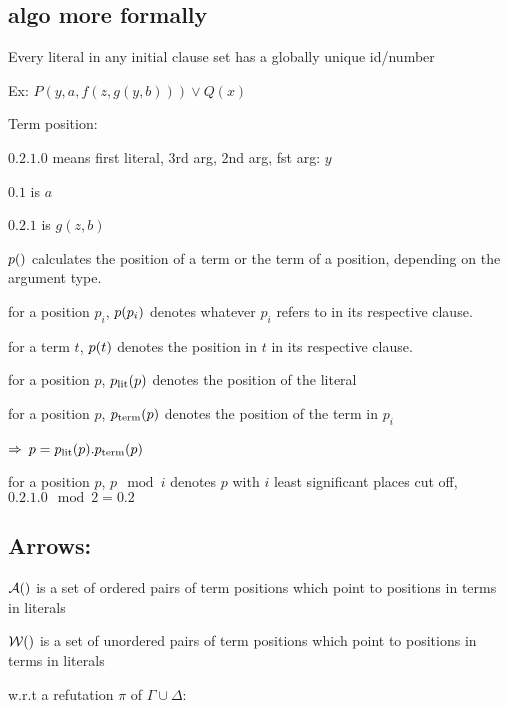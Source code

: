 \documentclass[,%
	paper=a4,%
	DIV14, 
	liststotoc,
	bibtotoc,
	draft=false,%
	numbers=noendperiod
]{scrartcl}
\begin{document}
\clearpage
\subsection{algo more formally}

Every literal in any initial clause set has a globally unique id/number

Ex: $P(y, a, f(z, g(y, b)) ) \lor Q(x)$

Term position:

$0.2.1.0$ means first literal, 3rd arg, 2nd arg, fst arg: $y$

$0.1$ is $a$

$0.2.1$ is $g(z, b)$

$\pos$ calculates the position of a term or the term of a position, depending on the argument type.

for a position $p_i$, $p(p_i)$ denotes whatever $p_i$ refers to in its respective clause.

for a term $t$, $p(t)$ denotes the position in $t$ in its respective clause.

for a position $p$, $p_\text{lit}(p)$ denotes the position of the literal

for a position $p$, $p_\text{term}(p)$ denotes the position of the term in $p_i$ 

$\Rightarrow$ $p = p_\text{lit}(p).p_\text{term}(p)$

for a position $p$, $p \mod i$ denotes $p$ with $i$ least significant places cut off, $0.2.1.0 \mod 2 = 0.2$

\subsection{Arrows:}

$\arr$ is a set of ordered pairs of term positions which point to positions in terms in literals

$\warr$ is a set of unordered pairs of term positions which point to positions in terms in literals

w.r.t a refutation $\pi$ of $\Gamma \cup \Delta$:
\end{document}
